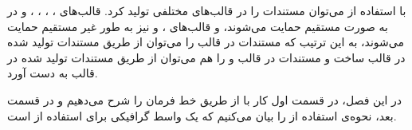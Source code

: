 با استفاده از   می‌توان مستندات را در قالب‌های مختلفی تولید کرد.
قالب‌های
، ، ، ،  و  
در  به صورت مستقیم حمایت می‌شوند، و قالب‌های
،  و  
نیز به طور غیر مستقیم حمایت می‌شوند، به این ترتیب که مستندات در قالب 
را می‌توان از طریق مستندات تولید شده در قالب  ساخت و مستندات در قالب
 و  را هم می‌توان از طریق مستندات تولید شده در قالب
 به دست آورد.


در این فصل، در قسمت اول کار با  از طریق خط فرمان را شرح می‌دهیم و در
قسمت بعد، نحوه‌ی استفاده از  را بیان می‌کنیم که یک واسط گرافیکی
برای استفاده از  است.